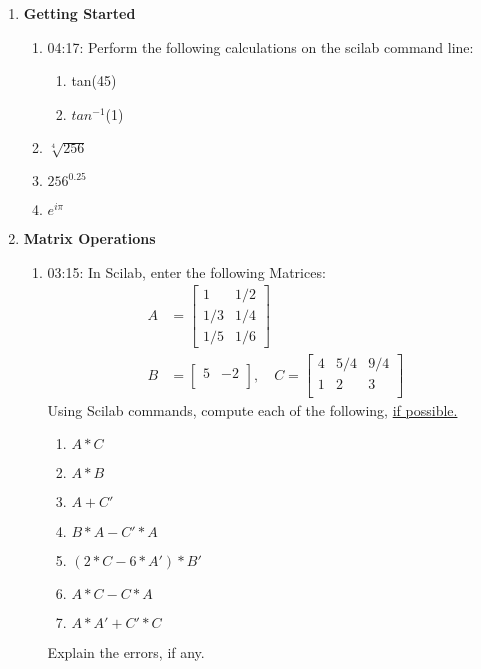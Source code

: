 \documentclass[12pt,a4paper]{article}
\newenvironment{enumcpt}{\begin{enumerate} \topsep -3mm \partopsep -3mm 
                        \parsep -3mm
                        \itemsep -0mm \leftmargin -1in \rightmargin -3mm
                        }{\end{enumerate}}
\begin{document}
\begin{multicols}{2}
\begin{enumcpt}
\item {\bf Getting Started }
	\begin{enumcpt}
	\item 04:17: Perform the following calculations on the scilab command line:

\begin{enumerate}
\item tan(45)
\item $tan^{-1}$(1)
\end{enumerate} 
\item $\sqrt[4]{256}$
\item $256^{0.25}$
\item $e^{i\pi}$
\end{enumcpt}

\item {\bf Matrix Operations}
\begin{enumcpt}
\item 03:15: In Scilab, enter the following Matrices: 
\begin{align*}
A&=\begin{bmatrix}
1 & 1/2\\
1/3 & 1/4\\
1/5 & 1/6
\end{bmatrix} \\
B& =\begin{bmatrix}
5 & -2\\
\end{bmatrix},
\quad
C=\begin{bmatrix}
4 & 5/4 & 9/4\\
1 & 2 & 3\\
\end{bmatrix}
\end{align*}
Using Scilab commands, compute each of the following, \underline{if possible.}
\begin{enumcpt}
\item $A*C$
\item $A*B$
\item $A+C'$
\item $B*A - C'*A$
\item $(2*C - 6*A')*B'$
\item $A*C - C*A$
\item $A*A' + C'*C$
\end{enumcpt} 
Explain the errors, if any.


\end{enumcpt}
\end{enumcpt}
\end{multicols}
\end{document}
